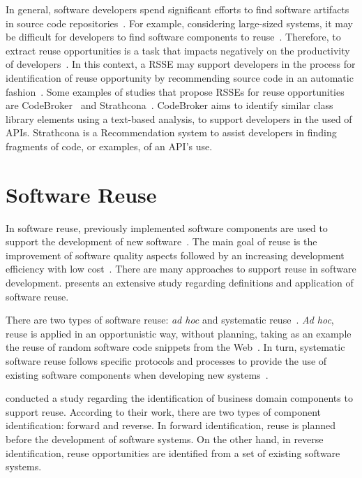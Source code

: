In general, software developers spend significant efforts to find software artifacts in source code repositories~\citep{Begel}. For example, considering large-sized systems, it may be difficult for developers to find software components to reuse~\citep{Ko:2006:ESD}. Therefore, to extract reuse opportunities is a task that impacts negatively on the productivity of developers~\citep{Begel}. In this context, a RSSE may support developers in the process for identification of reuse opportunity by recommending source code in an automatic fashion~\citep{Holmes}. Some examples of studies that propose RSSEs for reuse opportunities are CodeBroker~\citep{Ye:2005} and Strathcona~\citep{Holmes}. CodeBroker aims to identify similar class library elements using a text-based analysis, to support developers in the used of APIs. Strathcona is a Recommendation system  to assist developers in finding fragments of code, or examples, of an API's use.

\section{Software Reuse}
\label{sec:backReuse}

In software reuse, previously implemented software components are used to support the development of new software~\citep{krueger1992software}. The main goal of reuse is the improvement of software quality aspects followed by an increasing development efficiency with low cost~\citep{ravichandran2003software}. There are many approaches to support reuse in software development. \cite{krueger1992software} presents an extensive study regarding definitions and application of software reuse.

There are two types of software reuse: \textit{ad hoc} and systematic reuse~\citep{mohagheghi2007quality}. \textit{Ad hoc}, reuse is applied in an opportunistic way, without planning, taking as an example the reuse of random software code snippets from the  Web~\citep{sojer2011license}. In turn, systematic software reuse follows specific protocols and processes to provide the use of existing software components when developing new systems~\citep{mohagheghi2007quality}.

\cite{wang2005survey} conducted a study regarding the identification of business domain components to support reuse. According to their work, there are two types of component identification: forward  and reverse. In forward identification, reuse is planned before the development of software systems. On the other hand, in reverse identification, reuse opportunities are identified from a set of existing software systems. 

